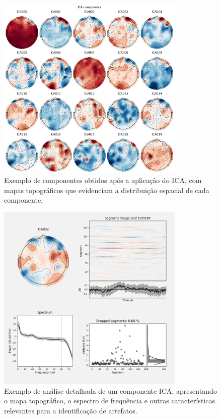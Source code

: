 \begin{figure}[htb]
    \centering
    \includegraphics[width=0.8\textwidth]{figs/1_preprocessamento_eeg/3_exemplo_compomentes_pos_ICA.png}
    \caption{Exemplo de componentes obtidos após a aplicação do ICA, com mapas topográficos que evidenciam a distribuição espacial de cada componente.}
    \label{fig:componentes_pos_ICA}
\end{figure}

\begin{figure}[htb]
    \centering
    \includegraphics[width=0.8\textwidth]{figs/1_preprocessamento_eeg/4_exemplo_ICA_component_analysis.png}
    \caption{Exemplo de análise detalhada de um componente ICA, apresentando o mapa topográfico, o espectro de frequência e outras características relevantes para a identificação de artefatos.}
    \label{fig:exemplo_ICA_component_analysis}
\end{figure}
